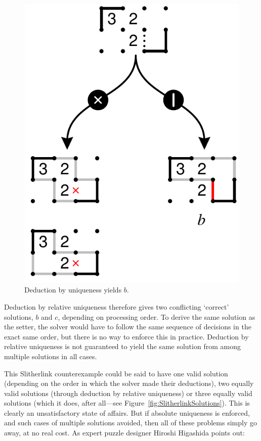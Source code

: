 \documentclass{gapd}
\begin{document}
\begin{figure}[htb]
  \centering
  \includegraphics[width=0.85\columnwidth]{graphics/slitherlink-deduce-b2.pdf}
  \caption{Deduction by uniqueness yields $b$.}
  \label{fig:SlitherlinkDeductionB}
\end{figure}

Deduction by relative uniqueness therefore gives two conflicting
`correct' solutions, $b$ and $c$, depending on processing order.  To
derive the same solution as the setter, the solver would have to
follow the same sequence of decisions in the exact same order, but
there is no way to enforce this in practice.  Deduction by relative
uniqueness is not guaranteed to yield the same solution from among
multiple solutions in all cases.

This Slitherlink counterexample could be said to have one valid
solution (depending on the order in which the solver made their
deductions), two equally valid solutions (through deduction by
relative uniqueness) or three equally valid solutions (which it does,
after all---see Figure~\ref{fig:SlitherlinkSolutions}).  This is
clearly an unsatisfactory state of affairs.  But if absolute
uniqueness is enforced, and such cases of multiple solutions avoided,
then all of these problems simply go away, at no real cost.  As expert
puzzle designer Hiroshi Higashida points out:
\end{document}
